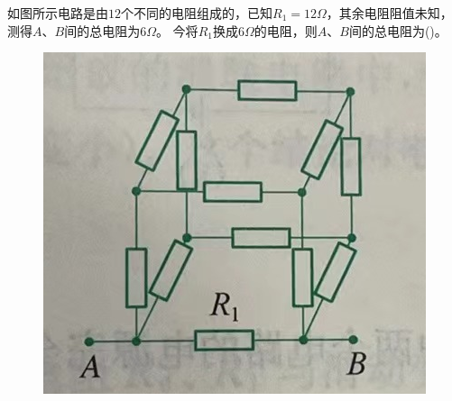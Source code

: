 \documentclass[a4paper,cs4size]{BHCexam}
\begin{document}
\begin{groups}
\begin{questions}[]
        \question[5]如图所示电路是由$12$个不同的电阻组成的，已知$R_1=12\Omega$，其余电阻阻值未知，测得$A$、$B$间的总电阻为$6\Omega$。
        今将$R_1$换成$6\Omega$的电阻，则$A$、$B$间的总电阻为(\quad\quad\quad)。
        \fourchoices{$6\Omega$}{$4\Omega$}{$3\Omega$}{$2\Omega$}
        \begin{figure}[htb]
            \flushright
            \includegraphics [scale=0.4,trim=0 0 0 0]{./image/physics_circuit2_5.png}
            \label{fig:fig_circuit2_5}
        \end{figure}
        \vspace{2.5cm}


\end{questions}
\end{groups}
\end{document}
